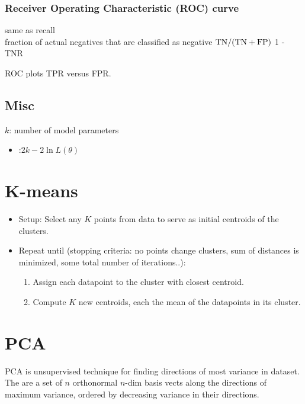 \documentclass[11pt]{article}
\begin{document}
\subsubsection{Receiver Operating Characteristic (ROC) curve}
 same as recall \\
 fraction of actual negatives that are
classified as negative $\textrm{TN}/(\textrm{TN} + \textrm{FP})$
 1 - TNR

ROC plots TPR versus FPR.

\subsection{Misc}
$k$: number of model parameters
\begin{itemize}
  \item {}:\quad $2k - 2 \ln L(\theta)$ \\
\end{itemize}



\section{K-means}
\label{sec:kmeans}
\begin{itemize}
  \setlength\itemsep{1pt}
  \item Setup: Select any $K$ points from data to serve as initial centroids of
  the clusters.
  \item Repeat until (stopping criteria: \eeg no points change clusters,
  sum of distances is minimized, some total number of iterations..):
  \begin{enumerate}
    \setlength\itemsep{1pt}
    \item Assign each datapoint to the cluster with closest centroid.
    \item Compute $K$ new centroids, each the mean of the datapoints in its
    cluster.
  \end{enumerate}
\end{itemize}



\section{PCA}
\label{sec:pca}
PCA is unsupervised technique for finding directions of most variance in
dataset. The  are a set of $n$ orthonormal
$n$-dim basis vects along the directions of maximum variance, ordered by
decreasing variance in their directions.
\end{document}
